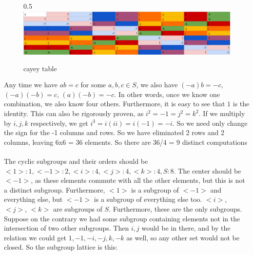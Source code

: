 \documentclass{article}
\begin{document}
\begin{figure}{0.5\textwidth}
    \includegraphics[width=1\textwidth]{cayley_quaternions.png}
  \caption{cayey table}
\end{figure}
 Any time we have $ab = c$ for some $a,b,c\in S$, we also have $(-a)b = -c$, $(-a)(-b) = c$, $(a)(-b) = -c$. In other words, once we know one combination, we also know four others. Furthermore, it is easy to see that $1$ is the identity. This can also be rigorously proven, as $i^2 = -1 = j^2 = k^2$. If we multiply by $i,j,k$ respectively, we get $i^3= i(ii) = i(-1) = -i.$ So we need only change the sign for the -1 columns and rows. So we have eliminated 2 rows and 2 columns, leaving 6x6 = 36 elements. So there are 36/4 = 9 distinct computations \\
\\
 The cyclic subgroups and their orders should be $<1>:1,<-1>:2,<i>:4,<j>:4,<k>:4,S:8$. The center should be $<-1>$, as these elements commute with all the other elements, but this is not a distinct subgroup. Furthermore, $<1>$ is a subgroup of $<-1>$ and everything else, but $<-1>$ is a subgroup of everything else too. $<i>$, $<j>$, $<k>$ are subgroups of $S$. Furthermore, these are the only subgroups. Suppose on the contrary we had some subgroup containing elements not in the intersection of two other subgroups. Then $i,j$ would be in there, and by the relation we could get $1,-1,-i,-j,k,-k$ as well, so any other set would not be closed. So the subgroup lattice is this:\\
\end{document}
